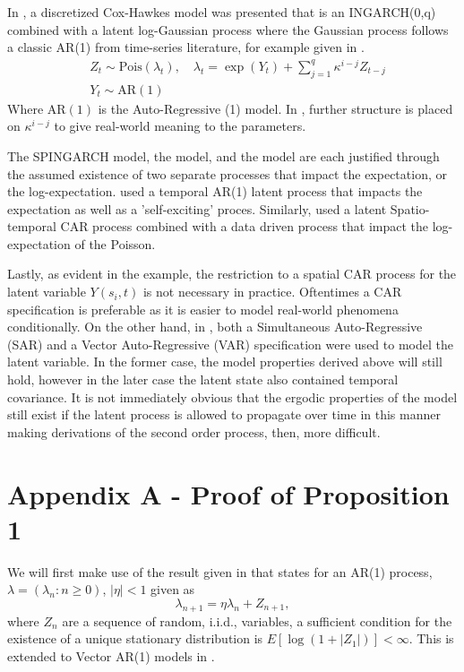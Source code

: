 \documentclass[11pt]{isuthesis}
\begin{document}
In \cite{mohler2013modeling}, a discretized Cox-Hawkes model was presented that is an INGARCH(0,q) combined with a latent log-Gaussian process where the Gaussian process follows a classic AR(1) from time-series literature, for example given in \cite{shumway2010time}. 
\begin{align}
	& Z_t\sim \mbox{Pois}(\lambda_t),\quad \lambda_t=\exp(Y_t)+\sum_{j=1}^q \kappa^{i-j} Z_{t-j} \\
	& Y_t \sim \mbox{AR}(1)
\end{align}
Where $\mbox{AR}(1)$ is the Auto-Regressive (1) model.  In \cite{mohler2013modeling}, further structure is placed on $\kappa^{i-j}$ to give real-world meaning to the parameters.

The SPINGARCH model, the \cite{martinez2008autoregressive} model, and \cite{mohler2013modeling} the model are each justified through the assumed existence of two separate processes that impact the expectation, or the log-expectation.  \cite{mohler2013modeling} used a temporal AR(1) latent process that impacts the expectation as well as a 'self-exciting' proces.  Similarly, \cite{martinez2008autoregressive} used a latent Spatio-temporal CAR process combined with a data driven process that impact the log-expectation of the Poisson. 

Lastly, as evident in the example, the restriction to a spatial CAR process for the latent variable $Y(s_i,t)$ is not necessary in practice.  Oftentimes a CAR specification is preferable as it is easier to model real-world phenomena conditionally.  On the other hand, in \cite{2017arXiv170308429C}, both a Simultaneous Auto-Regressive (SAR) and a Vector Auto-Regressive (VAR) specification were used to model the latent variable.  In the former case, the model properties derived above will still hold, however in the later case the latent state also contained temporal covariance.  It is not immediately obvious that the ergodic properties of the model still exist if the latent process is allowed to propagate over time in this manner making derivations of the second order process, then, more difficult.

\section*{Appendix A - Proof of Proposition 1}

We will first make use of the result given in \cite{athreya1986mixing} that states for an AR(1) process, $\lambda=(\lambda_n:n\geq 0)$, $|\eta|<1$ given as
\begin{equation}
	\lambda_{n+1}=\eta \lambda_{n}+Z_{n+1},
\end{equation}
where $Z_{n}$ are a sequence of random, i.i.d., variables, a sufficient condition for the existence of a unique stationary distribution is $E[\log(1+|Z_1|)]<\infty$.  This is extended to Vector AR(1) models in \cite{zeevi2004recurrence}.
\end{document}
